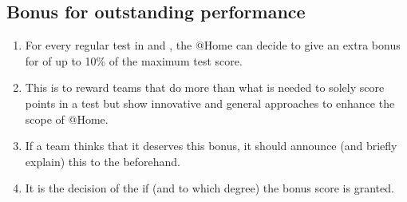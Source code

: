 \subsection{Bonus for outstanding performance}\label{rule:outstanding_performance}
\begin{enumerate}
	\item For every regular test in  and , the @Home  can decide to give an extra bonus for  of up to 10\% of the maximum test score.

	\item This is to reward teams that do more than what is needed to solely score points in a test but show innovative and general approaches to enhance the scope of @Home.

	\item If a team thinks that it deserves this bonus, it should announce (and briefly explain) this to the  beforehand.

	\item It is the decision of the  if (and to which degree) the bonus score is granted.
\end{enumerate}

